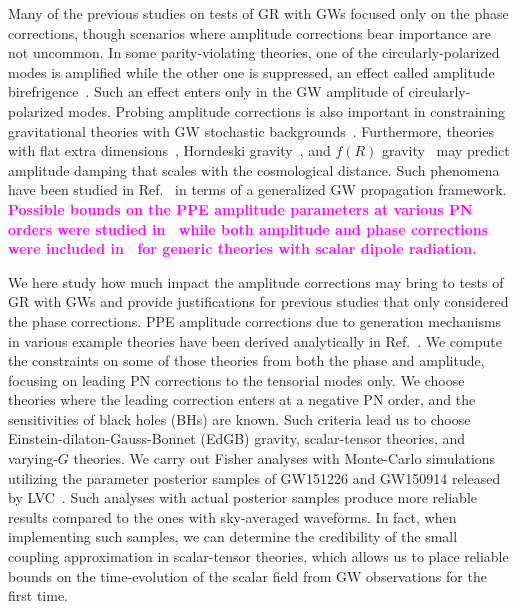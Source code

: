 \documentclass[prd,twocolumn,nofootinbib]{revtex4-1}
\newcommand{\kent}[1]{\textcolor{magenta}{\textbf{#1}} }
\begin{document}
Many of the previous studies on tests of GR with GWs focused only on the phase corrections, though scenarios where amplitude corrections bear importance  are not uncommon. In some parity-violating theories, one of the circularly-polarized modes is amplified while the other one is suppressed, an effect called amplitude birefrigence~\cite{Alexander:2007kv,Yunes:2008bu,Yunes:2010yf,Yagi:2017zhb}. Such an effect enters only in the GW amplitude of circularly-polarized modes. Probing amplitude corrections is also important in constraining gravitational theories with GW stochastic backgrounds~\cite{Maselli:2016ekw}. Furthermore, theories with flat extra dimensions~\cite{Cardoso:2002pa}, Horndeski gravity~\cite{Saltas:2014dha}, and $f(R)$ gravity~\cite{Hwang:1996xh} may predict amplitude damping that scales with the cosmological distance. Such phenomena have been studied in Ref.~\cite{Nishizawa:2017nef}  in terms of a generalized GW propagation framework. \kent{Possible bounds on the PPE amplitude parameters at various PN orders were studied in~\cite{Cornish:2011ys} while both amplitude and phase corrections were included in~\cite{Arun:2012hf} for generic theories with scalar dipole radiation.}



We here study how much impact the amplitude corrections may bring to tests of GR with GWs and provide justifications for previous studies that only considered the phase corrections.
PPE amplitude corrections due to generation mechanisms in various example theories have been derived analytically in Ref.~\cite{Tahura:2018zuq}. We compute the constraints on some of those theories from both the phase and amplitude, focusing on leading PN corrections to the tensorial modes only. We choose theories where the leading correction enters at a negative PN order, and the sensitivities of black holes (BHs) are known. Such criteria lead us to choose Einstein-dilaton-Gauss-Bonnet (EdGB) gravity, scalar-tensor theories, and varying-$G$ theories. We carry out Fisher analyses with Monte-Carlo simulations utilizing the parameter posterior samples of GW151226 and GW150914 released by LVC~\cite{ligo:sample}. Such analyses with actual posterior samples produce more reliable results compared to the ones with sky-averaged waveforms. In fact, when implementing such samples, we can determine the credibility of the small coupling approximation in scalar-tensor theories, which allows us to place reliable bounds on the time-evolution of the scalar field from GW observations for the first time.
\end{document}
